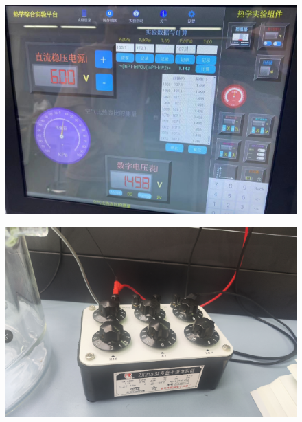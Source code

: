 \documentclass[UTF8]{article}
\begin{document}
\begin{appendix}
\begin{figure}[H]
	            	\includegraphics[clip,scale=0.5,trim={0 0 0 0}]{fig/fig13.png}
	            	\label{figure.15}
	\end{figure}
	\begin{figure}[H]
	            	\centering
	            	\includegraphics[clip,scale=0.5,trim={0 0 0 0}]{fig/fig14.png}
	            	\label{figure.15}
	\end{figure}
	\begin{figure}[H]
	            	\centering

\end{figure}
\end{appendix}
\end{document}
